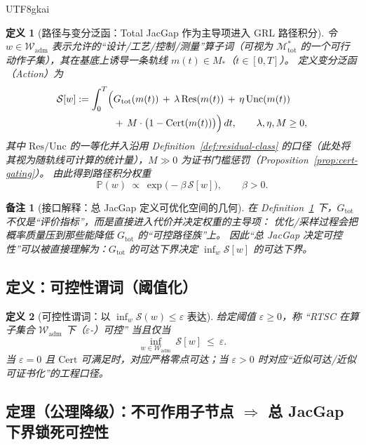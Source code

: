 \documentclass[12pt]{article}
\newtheorem{definition}{定义}[section]
\newtheorem{remark}{备注}[section]
\newcommand{\RTSC}{\textsf{RTSC}}
\begin{document}
\begin{CJK*}{UTF8}{gkai}
\begin{definition}[路径与变分泛函：Total JacGap 作为主导项进入 GRL 路径积分]
\label{def:rtsc-jacgap-action}
令 $w\in\mathcal{W}_{\mathrm{adm}}$ 表示允许的“设计/工艺/控制/测量”算子词（可视为 $\mathcal{M}_{\mathrm{tot}}^\ast$ 的一个可行动作子集），其在基底上诱导一条轨线
  $m(t)\in M_\ast$（$t\in[0,T]$）。
定义变分泛函（Action）为
\[
\begin{aligned}
\mathcal{S}[w]
:=
\int_{0}^{T}\Bigl(
&G_{\mathrm{tot}}(m(t))
\,+\,
\lambda\,\mathrm{Res}(m(t))
\,+\,
\eta\,\mathrm{Unc}(m(t))
\\
&+\,
M\cdot\bigl(1-\mathrm{Cert}(m(t))\bigr)
\Bigr)\,dt,
\qquad \lambda,\eta,M\ge 0,
\end{aligned}
\]
其中 $\mathrm{Res}/\mathrm{Unc}$ 的一等化并入沿用 Definition~\ref{def:residual-class} 的口径（此处将其视为随轨线可计算的统计量），$M\gg 0$
  为证书门槛惩罚（Proposition~\ref{prop:cert-gating}）。
由此得到路径积分权重
\[
\mathbb{P}(w)\ \propto\ \exp\!\bigl(-\beta\,\mathcal{S}[w]\bigr),
\qquad \beta>0.
\]
\end{definition}

\begin{remark}[接口解释：总 JacGap 定义可优化空间的几何]
在 Definition~\ref{def:rtsc-jacgap-action} 下，$G_{\mathrm{tot}}$ 不仅是“评价指标”，而是直接进入代价并决定权重的主导项：
优化/采样过程会把概率质量压到那些能降低 $G_{\mathrm{tot}}$ 的“可控路径族”上。
因此“总 JacGap 决定可控性”可以被直接理解为：$G_{\mathrm{tot}}$ 的可达下界决定 $\inf_w\mathcal{S}[w]$ 的可达下界。
\end{remark}

\subsection{定义：可控性谓词（阈值化）}

\begin{definition}[可控性谓词：以 $\inf_w\mathcal{S}(w)\le \varepsilon$ 表达]
\label{def:rtsc-jacgap-controllable}
给定阈值 $\varepsilon\ge 0$，称 “\RTSC{} 在算子集合 $\mathcal{W}_{\mathrm{adm}}$ 下（$\varepsilon$-）可控” 当且仅当
\[
\inf_{w\in\mathcal{W}_{\mathrm{adm}}}\ \mathcal{S}[w]\ \le\ \varepsilon.
\]
当 $\varepsilon=0$ 且 $\mathrm{Cert}$ 可满足时，对应严格零点可达；当 $\varepsilon>0$ 时对应“近似可达/近似可证书化”的工程口径。
\end{definition}

\subsection{定理（公理降级）：不可作用子节点 $\Rightarrow$ 总 JacGap 下界锁死可控性}


\end{CJK*}
\end{document}
